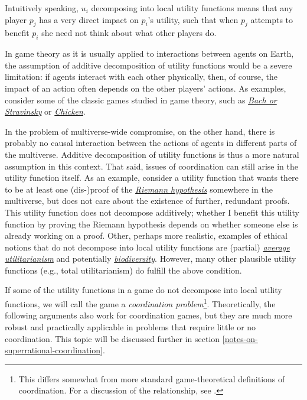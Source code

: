 Intuitively speaking, \(u_{i}\) decomposing into local utility functions
means that any player \(p_{j}\) has a very direct impact on \(p_{i}\)'s
utility, such that when \(p_{j}\) attempts to benefit \(p_{i}\) she need
not think about what other players do.

In game theory as it is usually applied to interactions between agents
on Earth, the assumption of additive decomposition of utility functions
would be a severe limitation: if agents interact with each other
physically, then, of course, the impact of an action often depends on
the other players' actions. As examples, consider some of the classic
games studied in game theory, such as
\href{https://en.wikipedia.org/wiki/Battle_of_the_sexes_(game_theory)}{\emph{Bach
or Stravinsky}} or
\href{https://en.wikipedia.org/wiki/Chicken_(game)}{\emph{Chicken}}.

In the problem of multiverse-wide compromise, on the other hand, there
is probably no causal interaction between the actions of agents in
different parts of the multiverse. Additive decomposition of utility
functions is thus a more natural assumption in this context. That said,
issues of coordination can still arise in the utility function itself.
As an example, consider a utility function that wants there to be at
least one (dis-)proof of the
\href{https://en.wikipedia.org/wiki/Riemann_hypothesis}{\emph{Riemann
hypothesis}} somewhere in the multiverse, but does not care about the
existence of further, redundant proofs. This utility function does not
decompose additively; whether I benefit this utility function by proving
the Riemann hypothesis depends on whether someone else is already
working on a proof. Other, perhaps more realistic, examples of ethical
notions that do not decompose into local utility functions are (partial)
\href{https://en.wikipedia.org/wiki/Average_and_total_utilitarianism}{\emph{average
utilitarianism}} and potentially
\href{https://en.wikipedia.org/wiki/Biodiversity}{\emph{biodiversity}}.
However, many other plausible utility functions (e.g., total
utilitarianism) do fulfill the above condition.

If some of the utility functions in a game do not decompose into local
utility functions, we will call the game a \emph{coordination
problem}\footnote{This differs somewhat from more standard
  game-theoretical definitions of coordination. For a discussion of the
  relationship, see \parencite{Oesterheld2017-lt}.}.
Theoretically, the following arguments also work for coordination games,
but they are much more robust and practically applicable in problems
that require little or no coordination. This topic will be discussed
further in section
\ref{notes-on-superrational-coordination}.

